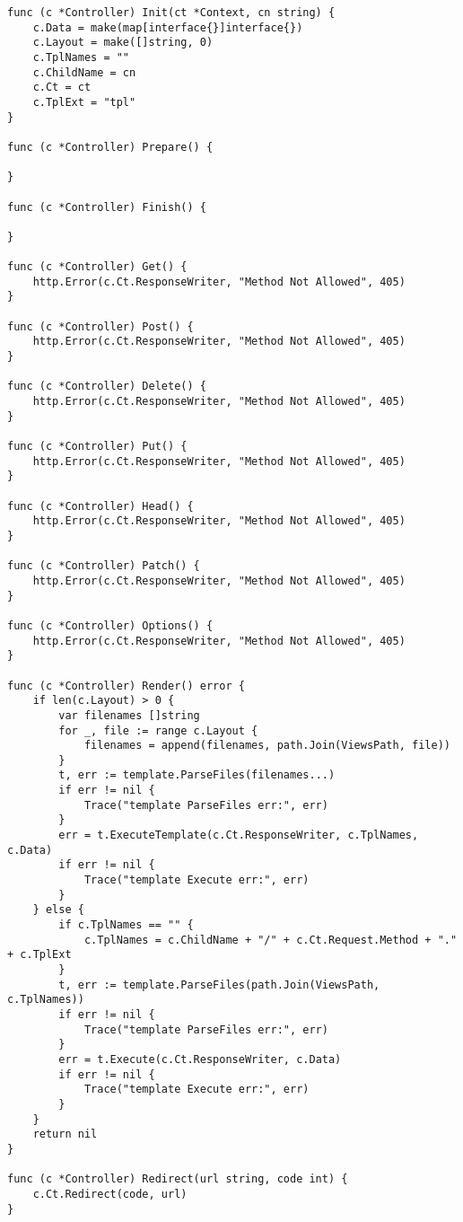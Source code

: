 \begin{lstlisting}[numbers=none]
func (c *Controller) Init(ct *Context, cn string) {
    c.Data = make(map[interface{}]interface{})
    c.Layout = make([]string, 0)
    c.TplNames = ""
    c.ChildName = cn
    c.Ct = ct
    c.TplExt = "tpl"
}

func (c *Controller) Prepare() {

}

func (c *Controller) Finish() {

}

func (c *Controller) Get() {
    http.Error(c.Ct.ResponseWriter, "Method Not Allowed", 405)
}

func (c *Controller) Post() {
    http.Error(c.Ct.ResponseWriter, "Method Not Allowed", 405)
}

func (c *Controller) Delete() {
    http.Error(c.Ct.ResponseWriter, "Method Not Allowed", 405)
}

func (c *Controller) Put() {
    http.Error(c.Ct.ResponseWriter, "Method Not Allowed", 405)
}

func (c *Controller) Head() {
    http.Error(c.Ct.ResponseWriter, "Method Not Allowed", 405)
}

func (c *Controller) Patch() {
    http.Error(c.Ct.ResponseWriter, "Method Not Allowed", 405)
}

func (c *Controller) Options() {
    http.Error(c.Ct.ResponseWriter, "Method Not Allowed", 405)
}

func (c *Controller) Render() error {
    if len(c.Layout) > 0 {
        var filenames []string
        for _, file := range c.Layout {
            filenames = append(filenames, path.Join(ViewsPath, file))
        }
        t, err := template.ParseFiles(filenames...)
        if err != nil {
            Trace("template ParseFiles err:", err)
        }
        err = t.ExecuteTemplate(c.Ct.ResponseWriter, c.TplNames, c.Data)
        if err != nil {
            Trace("template Execute err:", err)
        }
    } else {
        if c.TplNames == "" {
            c.TplNames = c.ChildName + "/" + c.Ct.Request.Method + "." + c.TplExt
        }
        t, err := template.ParseFiles(path.Join(ViewsPath, c.TplNames))
        if err != nil {
            Trace("template ParseFiles err:", err)
        }
        err = t.Execute(c.Ct.ResponseWriter, c.Data)
        if err != nil {
            Trace("template Execute err:", err)
        }
    }
    return nil
}

func (c *Controller) Redirect(url string, code int) {
    c.Ct.Redirect(code, url)
}
\end{lstlisting}

